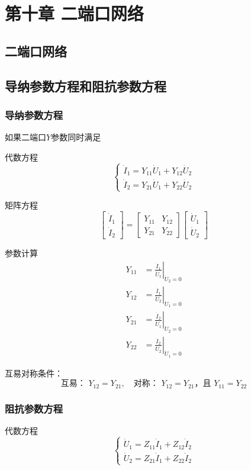 \chapter{第十章 二端口网络}

\section{二端口网络}

\section{导纳参数方程和阻抗参数方程}
\subsection{导纳参数方程}
如果二端口$Y$参数同时满足

代数方程
\[
\begin{cases}
\dot{I}_1 = Y_{11}\dot{U}_1 + Y_{12}\dot{U}_2 \\
\dot{I}_2 = Y_{21}\dot{U}_1 + Y_{22}\dot{U}_2
\end{cases}
\]

矩阵方程
\[
\begin{bmatrix}
\dot{I}_1 \\
\dot{I}_2
\end{bmatrix}
=
\begin{bmatrix}
Y_{11} & Y_{12} \\
Y_{21} & Y_{22}
\end{bmatrix}
\begin{bmatrix}
\dot{U}_1 \\
\dot{U}_2
\end{bmatrix}
\]

参数计算
\[
\begin{align*}
Y_{11} &= \left. \frac{\dot{I}_1}{\dot{U}_1} \right|_{\dot{U}_2 = 0}\\
Y_{12} &= \left.  \frac{\dot{I}_1}{\dot{U}_2} \right|_{\dot{U}_1 = 0} \\
Y_{21} &= \left. \frac{\dot{I}_2}{\dot{U}_1} \right|_{\dot{U}_2 = 0}\\
Y_{22} &= \left. \frac{\dot{I}_2}{\dot{U}_2} \right|_{\dot{U}_1 = 0}
\end{align*}
\]

互易对称条件：
\[
\text{互易： } Y_{12} = Y_{21},\quad
\text{对称： } Y_{12} = Y_{21} \text{，且 } Y_{11} = Y_{22}
\]

\subsection{阻抗参数方程}
代数方程
\[
\begin{cases}
\dot{U}_1 = Z_{11}\dot{I}_1 + Z_{12}\dot{I}_2 \\
\dot{U}_2 = Z_{21}\dot{I}_1 + Z_{22}\dot{I}_2
\end{cases}
\]

